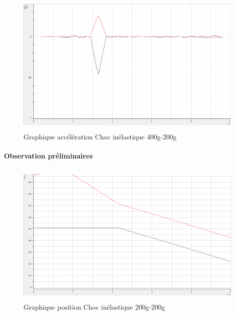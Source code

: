 \newpage

\begin{figure}[h]
    \caption[Graphique accélération Choc inélastique 400g-200g]{Graphique accélération Choc inélastique 400g-200g}
    \centering
    \includegraphics[height=19em]{Data/400-200inela02a.png}
\end{figure}

\paragraph{Observation préliminaires}

\newpage

\begin{figure}[h]
    \caption[Graphique position Choc inélastique 200g-200g]{Graphique position Choc inélastique 200g-200g}
    \centering
    \includegraphics[height=19em]{Data/200-200inela01.png}
\end{figure}

